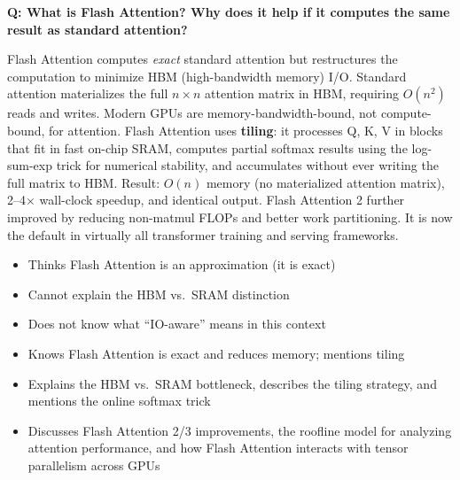\bigskip

\begin{interviewq}
\textbf{Q: What is Flash Attention? Why does it help if it computes the same
result as standard attention?}

 \quad {} \quad \badgefreq{\freqmed}

\stronganswer
Flash Attention computes \emph{exact} standard attention but restructures the
computation to minimize HBM (high-bandwidth memory) I/O.  Standard attention
materializes the full $n \times n$ attention matrix in HBM, requiring $O(n^2)$
reads and writes.  Modern GPUs are memory-bandwidth-bound, not compute-bound,
for attention.  Flash Attention uses \textbf{tiling}: it processes Q, K, V in
blocks that fit in fast on-chip SRAM, computes partial softmax results using
the log-sum-exp trick for numerical stability, and accumulates without ever
writing the full matrix to HBM.  Result: $O(n)$ memory (no materialized
attention matrix), 2--4$\times$ wall-clock speedup, and identical output.
Flash Attention 2 further improved by reducing non-matmul FLOPs and better
work partitioning.  It is now the default in virtually all transformer
training and serving frameworks.

\redflags
\begin{itemize}
    \item Thinks Flash Attention is an approximation (it is exact)
    \item Cannot explain the HBM vs.\ SRAM distinction
    \item Does not know what ``IO-aware'' means in this context
\end{itemize}


\goodgreat
\begin{itemize}
    \item {} Knows Flash Attention is exact and reduces memory; mentions
          tiling
    \item {} Explains the HBM vs.\ SRAM bottleneck, describes the tiling
          strategy, and mentions the online softmax trick
    \item {} Discusses Flash Attention 2/3 improvements, the roofline
          model for analyzing attention performance, and how Flash Attention
          interacts with tensor parallelism across GPUs
\end{itemize}

\end{interviewq}

